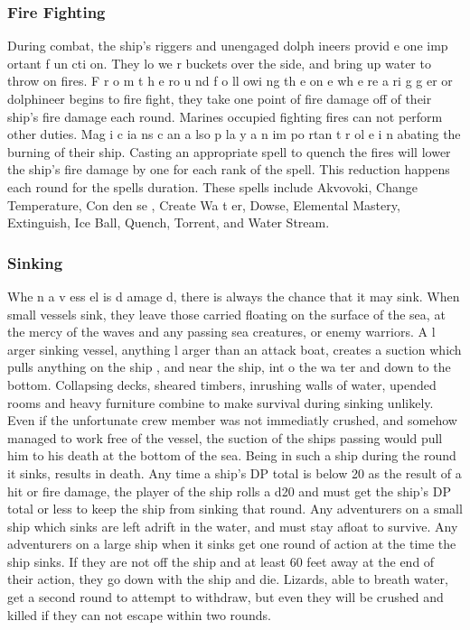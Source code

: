 \begin{multicols*}{2}
\subsubsection{Fire Fighting}
During combat, the ship's riggers and unengaged
dolph ineers provid e one imp ortant f un cti on. They lo we r
buckets over the side, and bring up water to throw on fires.
F r o m t h e ro u nd f o ll owi ng th e on e wh e re a ri g g er or
dolphineer begins to fire fight, they take one point of fire
damage off of their ship's fire damage each round. Marines
occupied fighting fires can not perform other duties.
Mag i c ia ns c an a lso p la y a n im po rtan t r ol e i n
abating the burning of their ship. Casting an appropriate spell
to quench the fires will lower the ship's fire damage by one
for each rank of the spell. This reduction happens each round
for the spells duration. These spells include Akvovoki, Change
Temperature, Con den se , Create Wa t er, Dowse, Elemental
Mastery, Extinguish, Ice Ball, Quench, Torrent, and Water
Stream.
\subsubsection{Sinking}
Whe n a v ess el is d amage d, there is always the
chance that it may sink. When small vessels sink, they leave
those carried floating on the surface of the sea, at the mercy of
the waves and any passing sea creatures, or enemy warriors.
A l arger sinking vessel, anything l arger than an
attack boat, creates a suction which pulls anything on the
ship , and near the ship, int o the wa ter and down to the
bottom. Collapsing decks, sheared timbers, inrushing walls of
water, upended rooms and heavy furniture combine to make
survival during sinking unlikely. Even if the unfortunate crew
member was not immediatly crushed, and somehow managed
to work free of the vessel, the suction of the ships passing
would pull him to his death at the bottom of the sea. Being in
such a ship during the round it sinks, results in death.
Any time a ship's DP total is below 20 as the result
of a hit or fire damage, the player of the ship rolls a d20 and
must get the ship's DP total or less to keep the ship from
sinking that round. Any adventurers on a small ship which
sinks are left adrift in the water, and must stay afloat to
survive.
Any adventurers on a large ship when it sinks get
one round of action at the time the ship sinks. If they are not
off the ship and at least 60 feet away at the end of their action,
they go down with the ship and die. Lizards, able to breath
water, get a second round to attempt to withdraw, but even
they will be crushed and killed if they can not escape within
two rounds.
\end{multicols*}